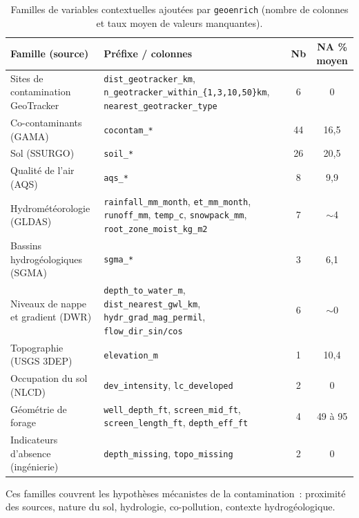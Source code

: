 \begin{table}[h!]
    \centering
    \caption{Familles de variables contextuelles ajout\'ees par \texttt{geoenrich} (nombre de colonnes et taux moyen de valeurs manquantes).}
    \label{tab:familles-enrichies}
    \small
    \begin{tabular}{p{4.2cm} p{6.2cm} c c}
        \hline
        Famille (source) & Pr\'efixe / colonnes & Nb & NA \% moyen \\
        \hline
        Sites de contamination GeoTracker & \texttt{dist\_geotracker\_km}, \texttt{n\_geotracker\_within\_\{1,3,10,50\}km}, \texttt{nearest\_geotracker\_type} & 6 & 0 \\
        Co-contaminants (GAMA) & \texttt{cocontam\_*} & 44 & 16,5 \\
        Sol (SSURGO) & \texttt{soil\_*} & 26 & 20,5 \\
        Qualit\'e de l'air (AQS) & \texttt{aqs\_*} & 8 & 9,9 \\
        Hydrom\'et\'eorologie (GLDAS) & \texttt{rainfall\_mm\_month}, \texttt{et\_mm\_month}, \texttt{runoff\_mm}, \texttt{temp\_c}, \texttt{snowpack\_mm}, \texttt{root\_zone\_moist\_kg\_m2} & 7 & $\sim$4 \\
        Bassins hydrog\'eologiques (SGMA) & \texttt{sgma\_*} & 3 & 6,1 \\
        Niveaux de nappe et gradient (DWR) & \texttt{depth\_to\_water\_m}, \texttt{dist\_nearest\_gwl\_km}, \texttt{hydr\_grad\_mag\_permil}, \texttt{flow\_dir\_sin/cos} & 6 & $\sim$0 \\
        Topographie (USGS 3DEP) & \texttt{elevation\_m} & 1 & 10,4 \\
        Occupation du sol (NLCD) & \texttt{dev\_intensity}, \texttt{lc\_developed} & 2 & 0 \\
        G\'eom\'etrie de forage & \texttt{well\_depth\_ft}, \texttt{screen\_mid\_ft}, \texttt{screen\_length\_ft}, \texttt{depth\_eff\_ft} & 4 & 49 \`a 95 \\
        Indicateurs d'absence (ing\'enierie) & \texttt{depth\_missing}, \texttt{topo\_missing} & 2 & 0 \\
        \hline
    \end{tabular}
\end{table}

Ces familles couvrent les hypoth\`eses m\'ecanistes de la contamination~: proximit\'e des sources, nature du sol, hydrologie, co-pollution, contexte hydrog\'eologique.

\label{sec:geoenrich-dataset-remplissage}


